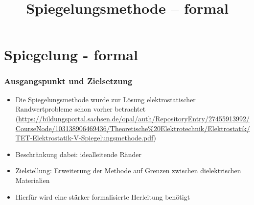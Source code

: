
\usepackage{tikz-3dplot}
\title[TET Vertiefung: Spiegelungsmethode -- formal]{Spiegelungsmethode -- formal}


% 
% 

\maketitle

% 
% 
\section{Spiegelung - formal}

\begin{frame}
  \frametitle{Ausgangspunkt und Zielsetzung}

    \begin{itemize}[<+->]
    \item Die \alert{Spiegelungsmethode} wurde zur Lösung elektrostatischer Randwertprobleme schon vorher betrachtet (\url{https://bildungsportal.sachsen.de/opal/auth/RepositoryEntry/27455913992/CourseNode/103138906469436/Theoretische\%20Elektrotechnik/Elektrostatik/TET-Elektrostatik-V-Spiegelungsmethode.pdf})
      \item Beschränkung dabei: \alert{idealleitende} Ränder 
    \item Zielstellung: Erweiterung der Methode auf Grenzen zwischen \alert{dielektrischen} Materialien
    \item Hierfür wird eine \alert{stärker formalisierte Herleitung} benötigt
    \end{itemize}
\end{frame}

